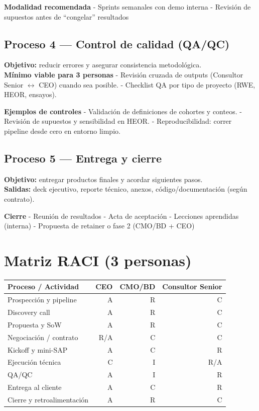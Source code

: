 \documentclass[
  spanish,
]{article}
\begin{document}
\textbf{Modalidad recomendada} - Sprints semanales con demo interna -
Revisión de supuestos antes de ``congelar'' resultados

\subsection{Proceso 4 --- Control de calidad
(QA/QC)}\label{proceso-4-control-de-calidad-qaqc}

\textbf{Objetivo:} reducir errores y asegurar consistencia
metodológica.\\
\textbf{Mínimo viable para 3 personas} - Revisión cruzada de outputs
(Consultor Senior \(\leftrightarrow\) CEO) cuando sea posible. - Checklist QA por tipo de
proyecto (RWE, HEOR, ensayos).

\textbf{Ejemplos de controles} - Validación de definiciones de cohortes
y conteos. - Revisión de supuestos y sensibilidad en HEOR. -
Reproducibilidad: correr pipeline desde cero en entorno limpio.

\subsection{Proceso 5 --- Entrega y
cierre}\label{proceso-5-entrega-y-cierre}

\textbf{Objetivo:} entregar productos finales y acordar siguientes
pasos.\\
\textbf{Salidas:} deck ejecutivo, reporte técnico, anexos,
código/documentación (según contrato).

\textbf{Cierre} - Reunión de resultados - Acta de aceptación - Lecciones
aprendidas (interna) - Propuesta de retainer o fase 2 (CMO/BD + CEO)

\section{Matriz RACI (3 personas)}\label{matriz-raci-3-personas}

\begin{longtable}[]{@{}lrrr@{}}
\toprule\noalign{}
Proceso / Actividad & CEO & CMO/BD & Consultor Senior \\
\midrule\noalign{}
\endhead
\bottomrule\noalign{}
\endlastfoot
Prospección y pipeline & A & R & C \\
Discovery call & A & R & C \\
Propuesta y SoW & A & R & C \\
Negociación / contrato & R/A & C & C \\
Kickoff y mini-SAP & A & C & R \\
Ejecución técnica & C & I & R/A \\
QA/QC & A & I & R \\
Entrega al cliente & A & C & R \\
Cierre y retroalimentación & A & R & C \\
\end{longtable}
\end{document}
